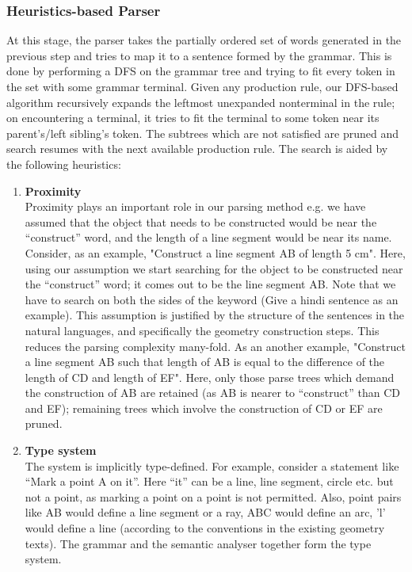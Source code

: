 \def\DevnagVersion{2.15}\documentclass[12pt]{article}
\begin{document}
\subsubsection{Heuristics-based Parser}
At this stage, the parser takes the partially ordered set of words generated in the previous step and tries to map it to a sentence formed by the grammar. This is done by performing a DFS on the grammar tree and trying to fit every token in the set with some grammar terminal. Given any production rule, our DFS-based algorithm recursively expands the leftmost unexpanded nonterminal in the rule; on encountering a terminal, it tries to fit the terminal to some token near its parent's/left sibling's token. The subtrees which are not satisfied are pruned and search resumes with the next available production rule. The search is aided by the following heuristics:
\begin{enumerate}
\item \textbf{Proximity}\label{sec:proximity}\\
Proximity plays an important role in our parsing method e.g. we have assumed that the object that needs to be constructed would be near the ``construct'' word, and the length of a line segment would be near its name. Consider, as an example, "Construct a line segment AB of length 5 cm". Here, using our assumption we start searching for the object to be constructed near the ``construct'' word; it comes out to be the line segment AB. Note that we have to search on both the sides of the keyword (Give a hindi sentence as an example). This assumption is justified by the structure of the sentences in the natural languages, and specifically the geometry construction steps. This reduces the parsing complexity many-fold. As an another example, "Construct a line segment AB such that length of AB is equal to the difference of the length of CD and length of EF". Here, only those parse trees which demand the construction of AB are retained (as AB is nearer to ``construct'' than CD and EF); remaining trees which involve the construction of CD or EF are pruned.

\item \textbf{Type system}\\
The system is implicitly type-defined. For example, consider a statement like  ``Mark a point A on it''. Here ``it'' can be a line, line segment, circle etc. but not a point, as marking a point on a point is not permitted. Also, point pairs like AB would define a line segment or a ray, ABC would define an arc, 'l' would define a line (according to the conventions in the existing geometry texts). The grammar and the semantic analyser together form the type system.


\end{enumerate}
\end{document}
